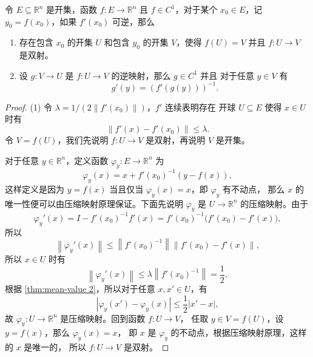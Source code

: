 \documentclass[fontset=none,zihao=-4]{Notes}
\newcommand{\norm}[1]{\left\lVert#1\right\rVert}
\newcommand{\abs}[1]{\left\lvert#1\right\rvert}
\begin{document}
\begin{theorem}[反函数定理]
  令 $E\subseteq\mathbb{R}^n$ 是开集，函数 $f:E\to\mathbb{R}^n$
  且 $f\in C^1$，对于某个 $x_0\in E$，记 $y_0=f(x_0)$，如果 $f'(x_0)$ 可逆，那么
  \begin{enumerate}
    \item 存在包含 $x_0$ 的开集 $U$ 和包含 $y_0$ 的开集 $V$，使得 $f(U)=V$ 并且
    $f:U\to V$ 是双射。
    \item 设 $g:V\to U$ 是 $f:U\to V$ 的逆映射，那么 $g\in C^1$ 并且
    对于任意 $y\in V$ 有
    \[
      g'(y)=(f'(g(y)))^{-1}.  
    \]
  \end{enumerate}
\end{theorem}
\begin{proof}
  (1) 令 $\lambda=1/\left(2\norm{f'(x_0)}\right)$，$f'$ 连续表明存在
  开球 $U\subseteq E$ 使得 $x\in U$ 时有
  \[
    \norm{f'(x)-f'(x_0)}\leq \lambda.  
  \]
  令 $V=f(U)$，我们先说明 $f:U\to V$ 是双射，再说明 $V$ 是开集。

  对于任意 $y\in\mathbb{R}^n$，定义函数 $\varphi_y:E\to\mathbb{R}^n$ 为
  \[
    \varphi_y(x)=x+f'(x_0)^{-1}(y-f(x)),  
  \]
  这样定义是因为 $y=f(x)$ 当且仅当 $\varphi_y(x)=x$，即 $\varphi_y$ 有不动点，
  那么 $x$ 的唯一性便可以由压缩映射原理保证。下面先说明 $\varphi_y$ 是
  $U\to\mathbb{R}^n$ 的压缩映射。由于
  \[
    \varphi_y'(x)=I-f'(x_0)^{-1}f'(x)=f'(x_0)^{-1}\bigl(f'(x_0)-f'(x)\bigr),  
  \]
  所以
  \[
    \norm{\varphi_y'(x)}\leq \norm{f'(x_0)^{-1}}\norm{f'(x_0)-f'(x)},
  \]
  所以 $x\in U$ 时有
  \[
    \norm{\varphi_y'(x)}\leq \lambda\norm{f'(x_0)^{-1}} =\frac{1}{2},
  \]
  根据 \autoref{thm:mean-value 2}，所以对于任意 $x,x'\in U$，有
  \begin{equation}\label{eq:contraction of varphi_y}
    \abs{\varphi_y(x')-\varphi_y(x)}\leq \frac{1}{2}\abs{x'-x}  ,
  \end{equation}
  故 $\varphi_y:U\to\mathbb{R}^n$ 是压缩映射。回到函数 $f:U\to V$，
  任取 $y\in V=f(U)$，设 $y=f(x)$，那么 $\varphi_y(x)=x$，
  即 $x$ 是 $\varphi_y$ 的不动点，根据压缩映射原理，这样的 $x$ 是唯一的，
  所以 $f:U\to V$ 是双射。


\end{proof}
\end{document}
